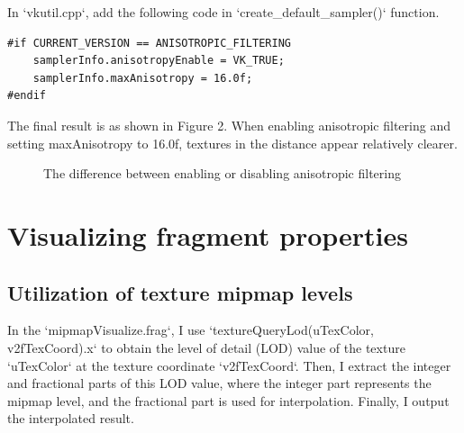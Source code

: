 \documentclass[10pt]{article}
\begin{document}
\noindent In `vkutil.cpp`, add the following code in `create\_default\_sampler()` function. 

\begin{lstlisting}
#if CURRENT_VERSION == ANISOTROPIC_FILTERING
    samplerInfo.anisotropyEnable = VK_TRUE;
    samplerInfo.maxAnisotropy = 16.0f;
#endif
\end{lstlisting}

\noindent The final result is as shown in Figure 2. When enabling anisotropic filtering and setting maxAnisotropy to 16.0f, textures in the distance appear relatively clearer.

\begin{figure}[htbp]
	\centering
    \caption{The difference between enabling or disabling anisotropic filtering}
\end{figure}

\section{Visualizing fragment properties}

\subsection{Utilization of texture mipmap levels}

\noindent In the `mipmapVisualize.frag`, I use `textureQueryLod(uTexColor, v2fTexCoord).x` to obtain the level of detail (LOD) value of the texture `uTexColor` at the texture coordinate `v2fTexCoord`. Then, I extract the integer and fractional parts of this LOD value, where the integer part represents the mipmap level, and the fractional part is used for interpolation. Finally, I output the interpolated result.
\end{document}
